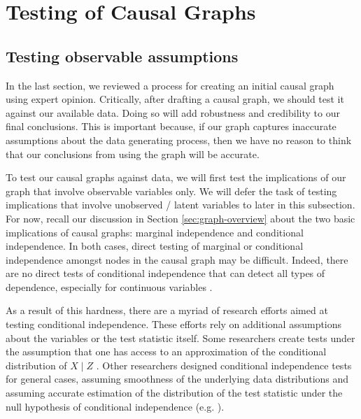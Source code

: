 \section{Testing of Causal Graphs}
\label{sec:graph-testing}

\subsection{Testing observable assumptions}
\label{sec:observable-tests}

In the last section, we reviewed a process for creating an initial causal graph using expert opinion.
Critically, after drafting a causal graph, we should test it against our available data.
Doing so will add robustness and credibility to our final conclusions.
This is important because, if our graph captures inaccurate assumptions about the data generating process, then we have no reason to think that our conclusions from using the graph will be accurate.

To test our causal graphs against data, we will first test the implications of our graph that involve observable variables only.
We will defer the task of testing implications that involve unobserved / latent variables to later in this subsection.
For now, recall our discussion in Section \ref{sec:graph-overview} about the two basic implications of causal graphs: marginal independence and conditional independence.
In both cases, direct testing of marginal or conditional independence amongst nodes in the causal graph may be difficult.
Indeed, there are no direct tests of conditional independence that can detect all types of dependence, especially for continuous variables \citep{bergsma_2004_testing, shah_2020_hardness}.

As a result of this hardness, there are a myriad of research efforts aimed at testing conditional independence.
These efforts rely on additional assumptions about the variables or the test statistic itself.
Some researchers create tests under the assumption that one has access to an approximation of the conditional distribution of $X \mid Z$ \citep{candes_2018_panning, berrett_2019_conditional}.
Other researchers designed conditional independence tests for general cases, assuming smoothness of the underlying data distributions and assuming accurate estimation of the distribution of the test statistic under the null hypothesis of conditional independence (e.g. \citet{zhang_2012_kernel, strobl_2019_approximate}).

